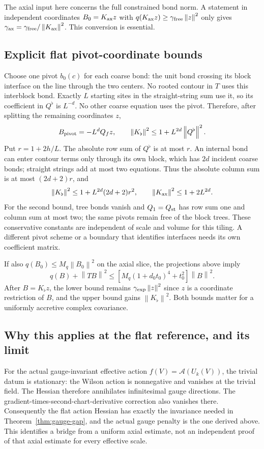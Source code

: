 \documentclass[11pt]{article}
\theoremstyle{remark}
\newcommand{\norm}[1]{\left\|#1\right\|}
\begin{document}
The axial input here concerns the full constrained bond norm. A
statement in independent coordinates $B_0=K_{\rm ax}z$ with
$q(K_{\rm ax}z)\ge\gamma_{\rm free}\norm z^2$ only gives
$\gamma_{\rm ax}=\gamma_{\rm free}/\norm{K_{\rm ax}}^2$.
This conversion is essential.

\subsection{Explicit flat pivot-coordinate bounds}

Choose one pivot $b_0(c)$ for each coarse bond: the unit bond crossing
its block interface on the line through the two centers. No rooted
contour in $T$ uses this interblock bond. Exactly $L$ starting sites
in the straight-string sum use it, so its coefficient in $Q^\flat$
is $L^{-d}$. No other coarse equation uses the pivot. Therefore,
after splitting the remaining coordinates $z$,
\[
 B_{\rm pivot}=-L^dQ_fz,\qquad
 \norm{K_\flat}^2\le1+L^{2d}\norm{Q^\flat}^2.
\]
Put $r=1+2h/L$. The absolute row sum of $Q^\flat$ is at most $r$.
An internal bond can enter contour terms only through its own block,
which has $2d$ incident coarse bonds; straight strings add at most
two equations. Thus the absolute column sum is at most $(2d+2)r$,
and
\begin{equation}\label{eq:pivot-bounds}
 \norm{K_\flat}^2\le1+L^{2d}(2d+2)r^2,
 \qquad \norm{K_{\rm ax}}^2\le1+2L^{2d}.
\end{equation}
For the second bound, tree bonds vanish and $Q_1=Q_{\rm st}$ has
row sum one and column sum at most two; the same pivots remain free
of the block trees. These conservative constants are independent of
scale and volume for this tiling. A different pivot scheme or a
boundary that identifies interfaces needs its own coefficient matrix.

If also $q(B_0)\le M_q\norm{B_0}^2$ on the axial slice, the
projections above imply
\[
 q(B)+\norm{TB}^2
 \le[M_q(1+d_0t_0)^4+t_0^2]\norm B^2.
\]
After $B=K_\flat z$, the lower bound remains
$\gamma_{\rm exp}\norm z^2$ since $z$ is a coordinate restriction
of $B$, and the upper bound gains $\norm{K_\flat}^2$.
Both bounds matter for a uniformly accretive complex covariance.

\subsection{Why this applies at the flat reference, and its limit}

For the actual gauge-invariant effective action
$f(V)=\mathcal A(U_k(V))$, the trivial datum is stationary: the
Wilson action is nonnegative and vanishes at the trivial field.
The Hessian therefore annihilates infinitesimal gauge directions.
The gradient-times-second-chart-derivative correction also vanishes
there. Consequently the flat action Hessian has exactly the invariance
needed in Theorem~\ref{thm:gauge-gap}, and the actual gauge penalty is
the one derived above. This identifies a bridge from a uniform axial
estimate, not an independent proof of that axial estimate for every
effective scale.
\end{document}
